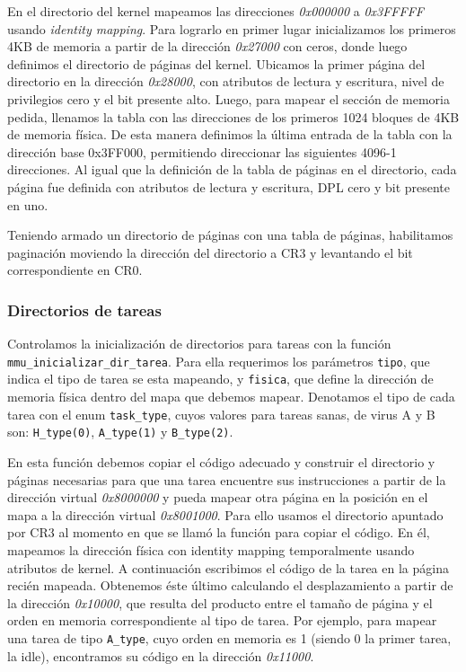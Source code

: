 En el directorio del kernel mapeamos las direcciones \textit{0x000000} a \textit{0x3FFFFF} usando \textit{identity mapping}.
Para lograrlo en primer lugar inicializamos los primeros 4KB de memoria a partir de la dirección \textit{0x27000} con ceros, donde luego definimos el directorio de páginas del kernel.
Ubicamos la primer página del directorio en la dirección \textit{0x28000}, con atributos de lectura y escritura, nivel de privilegios cero y el bit presente alto.
Luego, para mapear el sección de memoria pedida, llenamos la tabla con las direcciones de los primeros 1024 bloques de 4KB de memoria física. 
De esta manera definimos la última entrada de la tabla con la dirección base 0x3FF000, permitiendo direccionar las siguientes 4096-1 direcciones. 
Al igual que la definición de la tabla de páginas en el directorio, cada página fue definida con atributos de lectura y escritura, DPL cero y bit presente en uno.

Teniendo armado un directorio de páginas con una tabla de páginas, habilitamos paginación moviendo la dirección del directorio a CR3 y levantando el bit correspondiente en CR0.\\


\subsubsection{Directorios de tareas}
\label{sec-paginacion-tareas} 
Controlamos la inicialización de directorios para tareas con la función \verb|mmu_inicializar_dir_tarea|. 
Para ella requerimos los parámetros \verb|tipo|, que indica el tipo de tarea se esta mapeando, y \verb|fisica|, que define la dirección de memoria física dentro del mapa que debemos mapear. 
Denotamos el tipo de cada tarea con el enum \verb|task_type|, cuyos valores para tareas sanas, de virus A y B son: \verb|H_type(0)|, \verb|A_type(1)| y \verb|B_type(2)|.

En esta función debemos copiar el código adecuado y construir el directorio y páginas necesarias para que una tarea encuentre sus instrucciones a partir de la dirección virtual \textit{0x8000000} y pueda mapear otra página en la posición en el mapa a la dirección virtual \textit{0x8001000}.
Para ello usamos el directorio apuntado por CR3 al momento en que se llamó la función para copiar el código. En él, mapeamos la dirección física con identity mapping temporalmente usando atributos de kernel. A continuación escribimos el código de la tarea en la página recién mapeada.
Obtenemos éste último calculando el desplazamiento a partir de la dirección \textit{0x10000}, que resulta del producto entre el tamaño de página y el orden en memoria correspondiente al tipo de tarea. Por ejemplo, para mapear una tarea de tipo \verb|A_type|, cuyo orden en memoria es 1 (siendo 0 la primer tarea, la idle), encontramos su código en la dirección \textit{0x11000}.

